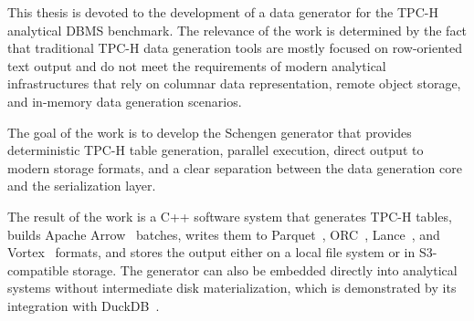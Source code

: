 This thesis is devoted to the development of a data generator for the TPC-H
analytical DBMS benchmark. The relevance of the work is determined by the fact
that traditional TPC-H data generation tools are mostly focused on row-oriented
text output and do not meet the requirements of modern analytical
infrastructures that rely on columnar data representation, remote object
storage, and in-memory data generation scenarios.

The goal of the work is to develop the Schengen generator that provides
deterministic TPC-H table generation, parallel execution, direct output to
modern storage formats, and a clear separation between the data generation core
and the serialization layer.

The result of the work is a C++ software system that generates TPC-H tables,
builds Apache Arrow~\cite{apache-arrow} batches, writes them to
Parquet~\cite{apache-parquet}, ORC~\cite{apache-orc},
Lance~\cite{lance-format}, and Vortex~\cite{vortex-format}
formats, and stores the output either on a local file system or in
S3-compatible storage. The generator can also be embedded directly
into analytical systems without intermediate disk materialization, which is
demonstrated by its integration with DuckDB~\cite{schengen-duckdb-repo}.
